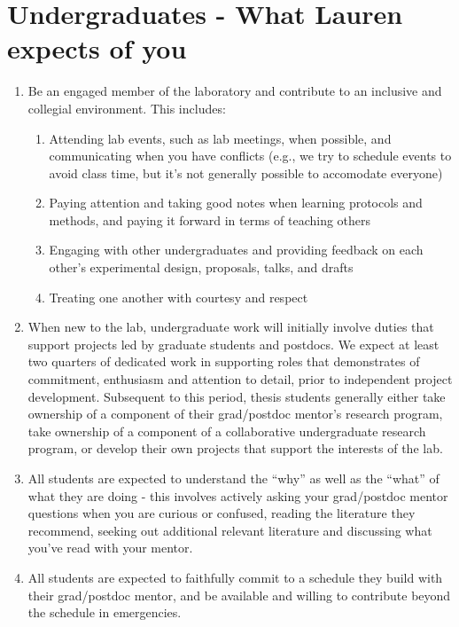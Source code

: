 \documentclass[12pt]{article}
\begin{document}
\section{Undergraduates - What Lauren expects of you}
\begin{enumerate}
\item Be an engaged member of the laboratory and contribute to an inclusive and collegial environment. This includes:
\begin{enumerate}
\item Attending lab events, such as lab meetings, when possible, and communicating when you have conflicts (e.g., we try to schedule events to avoid class time, but it's not generally possible to accomodate everyone)
\item Paying attention and taking good notes when learning protocols and methods, and paying it forward in terms of teaching others 
\item Engaging with other undergraduates and providing feedback on each other's experimental design, proposals, talks, and drafts
\item Treating one another with courtesy and respect
\end{enumerate}

\item When new to the lab, undergraduate work will initially involve duties that support projects led by graduate students and postdocs. We expect at least two quarters of dedicated work in supporting roles that demonstrates of commitment, enthusiasm and attention to detail, prior to independent project development. Subsequent to this period, thesis students generally either take ownership of a component of their grad/postdoc mentor's research program, take ownership of a component of a collaborative undergraduate research program, or develop their own projects that support the interests of the lab. 

\item All students are expected to understand the ``why'' as well as the ``what'' of what they are doing - this involves actively asking your grad/postdoc mentor questions when you are curious or confused, reading the literature they recommend, seeking out additional relevant literature and discussing what you've read with your mentor.

\item All students are expected to faithfully commit to a schedule they build with their grad/postdoc mentor, and be available and willing to contribute beyond the schedule in emergencies.


\end{enumerate}
\end{document}
